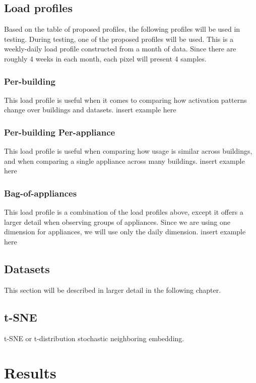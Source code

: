 \subsection{Load profiles}

Based on the table of proposed profiles, the following profiles will be used in testing.
During testing, one of the proposed profiles will be used.
This is a weekly-daily load profile constructed from a month of data. 
Since there are roughly 4 weeks in each month, each pixel will present 4 samples. 

\subsubsection{Per-building}
This load profile is useful when it comes to comparing how activation patterns change over buildings and datasets.
insert example here
\subsubsection{Per-building Per-appliance}
This load profile is useful when comparing how usage is similar across buildings, and when
comparing a single appliance across many buildings. 
insert example here

\subsubsection{Bag-of-appliances}
This load profile is a combination of the load profiles above,
except it offers a larger detail when observing groups of appliances.
Since we are using one dimension for appliances, we will use only the daily dimension.
insert example here

\subsection{Datasets}
This section will be described in larger detail in the following chapter.

\subsection{t-SNE}

t-SNE or t-distribution stochastic neighboring embedding.

\section{Results}

